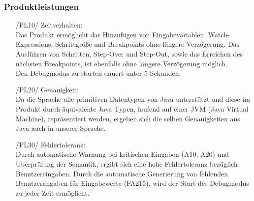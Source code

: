 \documentclass[parskip=full]{scrartcl}
\begin{document}
		\subsubsection{Produktleistungen}
		\begin{itemize}
		\item[/PL10/] Zeitverhalten: \\
		Das Produkt ermöglicht das Hinzufügen von Eingabevariablen, Watch-Expressions, Schrittgröße und Breakpoints ohne längere Verzögerung. Das Ausführen von Schritten, Step-Over und Step-Out, sowie das Erreichen des nächsten Breakpoints, ist ebenfalls ohne längere Verzögerung möglich. \\
		Den Debugmodus zu starten dauert unter 5 Sekunden. 
		\item[/PL20/] Genauigkeit: \\
		Da die Sprache alle primitiven Datentypen von Java unterstützt und diese im Produkt durch äquivalente Java Typen, laufend auf einer JVM (Java Virtual Machine), repräsentiert werden, ergeben sich die selben Genauigkeiten aus Java auch in unserer Sprache. %
		\newpage
		\item[/PL30/] Fehlertoleranz: \\
		Durch automatische Warnung bei kritischen Eingaben (A10, A20) und Überprüfung der Semantik, ergibt sich eine hohe Fehlertoleranz bezüglich Benutzereingaben.
		Durch die automatische Generierung von fehlenden Benutzerangaben für Eingabewerte (FA215), wird der Start des Debugmodus zu jeder Zeit ermöglicht.
		\end{itemize}
		
\end{document}
